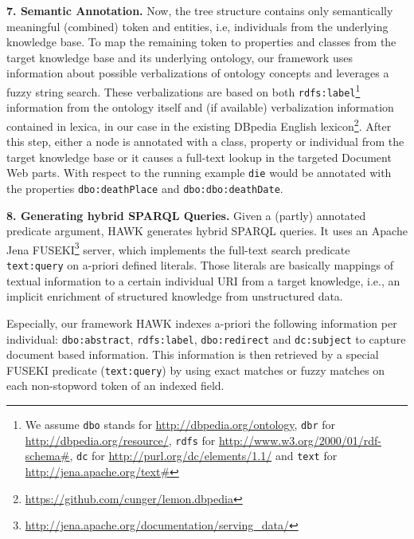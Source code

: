 \documentclass{llncs}
\begin{document}
\textbf{7. Semantic Annotation.}
Now, the tree structure contains only semantically meaningful (combined) token and entities, i.e, individuals from the underlying knowledge base. 
To map the remaining token to properties and classes from the target knowledge base and its underlying ontology, our framework uses information about possible verbalizations of ontology concepts and leverages a fuzzy string search.
These verbalizations are based on both \texttt{rdfs:label}\footnote{We assume \texttt{dbo} stands for \url{http://dbpedia.org/ontology}, \texttt{dbr} for \url{http://dbpedia.org/resource/}, \texttt{rdfs} for \url{http://www.w3.org/2000/01/rdf-schema#}, \texttt{dc} for \url{http://purl.org/dc/elements/1.1/} and \texttt{text} for \url{http://jena.apache.org/text#} } information from the ontology itself and (if available) verbalization information contained in lexica, in our case in the existing DBpedia English lexicon\footnote{\url{https://github.com/cunger/lemon.dbpedia}}.
After this step, either a node is annotated with a class, property or individual from the target knowledge base or it causes a full-text lookup in the targeted Document Web parts.
With respect to the running example \texttt{die} would be annotated with the properties \texttt{dbo:deathPlace} and \texttt{dbo:dbo:deathDate}.

\textbf{8. Generating hybrid SPARQL Queries.}
Given a (partly) annotated predicate argument, HAWK generates hybrid SPARQL queries.
It uses an Apache Jena FUSEKI\footnote{\url{http://jena.apache.org/documentation/serving_data/}} server, which implements the full-text search predicate \texttt{text:query} on a-priori defined literals. 
Those literals are basically mappings of textual information to a certain individual URI from a target knowledge, i.e., an implicit enrichment of structured knowledge from unstructured data. 

Especially, our framework HAWK indexes a-priori the following information per individual: \texttt{dbo:abstract}, \texttt{rdfs:label}, \texttt{dbo:redirect} and \texttt{dc:subject} to capture document based information.
This information is then retrieved by a special FUSEKI predicate (\texttt{text:query}) by using exact matches or fuzzy matches on each non-stopword token of an indexed field.
\end{document}
